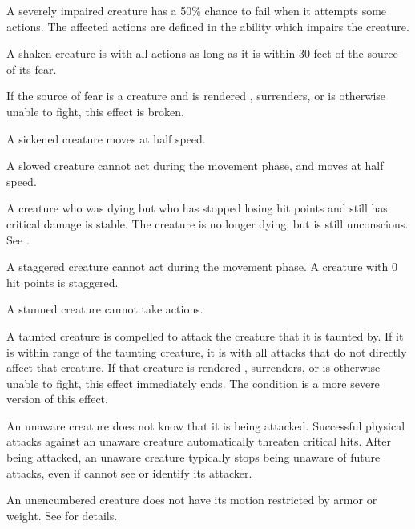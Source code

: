  A severely impaired creature has a 50\% chance to fail when it attempts some actions. The affected actions are defined in the ability which impairs the creature.

 A shaken creature is \impaired with all actions as long as it is within 30 feet of the source of its fear.

If the source of fear is a creature and is rendered \helpless, surrenders, or is otherwise unable to fight, this effect is broken.

 A sickened creature moves at half speed.

 A slowed creature cannot act during the movement phase, and moves at half speed.

 A creature who was dying but who has stopped losing hit points and still has critical damage is stable. The creature is no longer dying, but is still unconscious. See .

 A staggered creature cannot act during the movement phase. A creature with 0 hit points is staggered.

 A stunned creature cannot take actions.

 A taunted creature is compelled to attack the creature that it is taunted by.
If it is within \rngmed range of the taunting creature, it is \severelyimpaired with all attacks that do not directly affect that creature.
If that creature is rendered \helpless, surrenders, or is otherwise unable to fight, this effect immediately ends.
The  condition is a more severe version of this effect.

 An unaware creature does not know that it is being attacked. Successful physical attacks against an unaware creature automatically threaten critical hits. After being attacked, an unaware creature typically stops being unaware of future attacks, even if cannot see or identify its attacker.

 An unencumbered creature does not have its motion restricted by armor or weight. See  for details.
